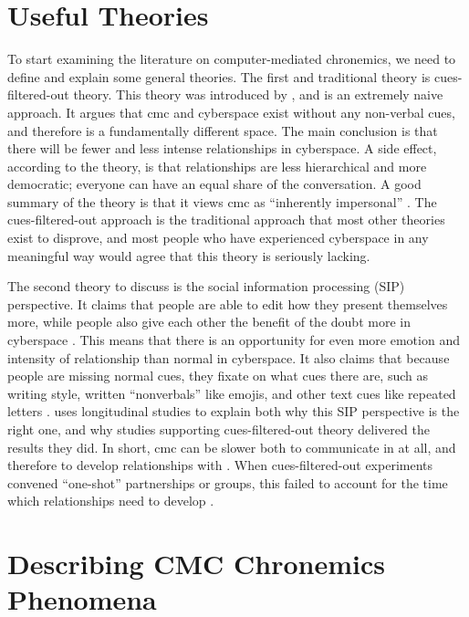 \documentclass[
  stu]{apa7}
\begin{document}
\hypertarget{useful-theories}{%
\section{Useful Theories}\label{useful-theories}}

To start examining the literature on computer-mediated chronemics, we
need to define and explain some general theories. The first and
traditional theory is cues-filtered-out theory. This theory was
introduced by \textcite{sproull91}, and is an extremely naive approach.
It argues that cmc and cyberspace exist without any non-verbal cues, and
therefore is a fundamentally different space. The main conclusion is
that there will be fewer and less intense relationships in cyberspace. A
side effect, according to the theory, is that relationships are less
hierarchical and more democratic; everyone can have an equal share of
the conversation. A good summary of the theory is that it views cmc as
``inherently impersonal'' \autocite[ 16]{kim05}. The cues-filtered-out
approach is the traditional approach that most other theories exist to
disprove, and most people who have experienced cyberspace in any
meaningful way would agree that this theory is seriously lacking.

The second theory to discuss is the social information processing (SIP)
perspective. It claims that people are able to edit how they present
themselves more, while people also give each other the benefit of the
doubt more in cyberspace \autocite{kim05}. This means that there is an
opportunity for even more emotion and intensity of relationship than
normal in cyberspace. It also claims that because people are missing
normal cues, they fixate on what cues there are, such as writing style,
written ``nonverbals'' like emojis, and other text cues like repeated
letters \autocite{kim05}. \textcite{walther96} uses longitudinal studies
to explain both why this SIP perspective is the right one, and why
studies supporting cues-filtered-out theory delivered the results they
did. In short, cmc can be slower both to communicate in at all, and
therefore to develop relationships with \autocite[ 12]{walther96}. When
cues-filtered-out experiments convened ``one-shot'' partnerships or
groups, this failed to account for the time which relationships need to
develop \autocite[ 12]{walther96}.

\hypertarget{describing-cmc-chronemics-phenomena}{%
\section{Describing CMC Chronemics
Phenomena}\label{describing-cmc-chronemics-phenomena}}
\end{document}
